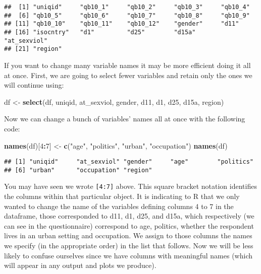 \documentclass[
]{book}
\newenvironment{Shaded}{\begin{snugshade}}{\end{snugshade}}
\newcommand{\DecValTok}[1]{\textcolor[rgb]{0.00,0.00,0.81}{#1}}
\newcommand{\FunctionTok}[1]{\textcolor[rgb]{0.13,0.29,0.53}{\textbf{#1}}}
\newcommand{\NormalTok}[1]{#1}
\newcommand{\OtherTok}[1]{\textcolor[rgb]{0.56,0.35,0.01}{#1}}
\newcommand{\SpecialCharTok}[1]{\textcolor[rgb]{0.81,0.36,0.00}{\textbf{#1}}}
\newcommand{\StringTok}[1]{\textcolor[rgb]{0.31,0.60,0.02}{#1}}
\begin{document}
\begin{verbatim}
##  [1] "uniqid"     "qb10_1"     "qb10_2"     "qb10_3"     "qb10_4"    
##  [6] "qb10_5"     "qb10_6"     "qb10_7"     "qb10_8"     "qb10_9"    
## [11] "qb10_10"    "qb10_11"    "qb10_12"    "gender"     "d11"       
## [16] "isocntry"   "d1"         "d25"        "d15a"       "at_sexviol"
## [21] "region"
\end{verbatim}

If you want to change many variable names it may be more efficient doing it all at once. First, we are going to select fewer variables and retain only the ones we will continue using:

\begin{Shaded}
\begin{Highlighting}[]
\NormalTok{df }\OtherTok{\textless{}{-}} \FunctionTok{select}\NormalTok{(df, uniqid, at\_sexviol, gender, d11, d1, d25, d15a, region)}
\end{Highlighting}
\end{Shaded}

Now we can change a bunch of variables' names all at once with the following code:

\begin{Shaded}
\begin{Highlighting}[]
\FunctionTok{names}\NormalTok{(df)[}\DecValTok{4}\SpecialCharTok{:}\DecValTok{7}\NormalTok{] }\OtherTok{\textless{}{-}} \FunctionTok{c}\NormalTok{(}\StringTok{"age"}\NormalTok{, }\StringTok{"politics"}\NormalTok{, }\StringTok{"urban"}\NormalTok{, }\StringTok{"occupation"}\NormalTok{)}
\FunctionTok{names}\NormalTok{(df)}
\end{Highlighting}
\end{Shaded}

\begin{verbatim}
## [1] "uniqid"     "at_sexviol" "gender"     "age"        "politics"  
## [6] "urban"      "occupation" "region"
\end{verbatim}

You may have seen we wrote \texttt{{[}4:7{]}} above. This square bracket notation identifies the columns within that particular object. It is indicating to R that we only wanted to change the name of the variables defining columns 4 to 7 in the dataframe, those corresponded to d11, d1, d25, and d15a, which respectively (we can see in the questionnaire) correspond to age, politics, whether the respondent lives in an urban setting and occupation. We assign to those columns the names we specify (in the appropriate order) in the list that follows. Now we will be less likely to confuse ourselves since we have columns with meaningful names (which will appear in any output and plots we produce).
\end{document}
